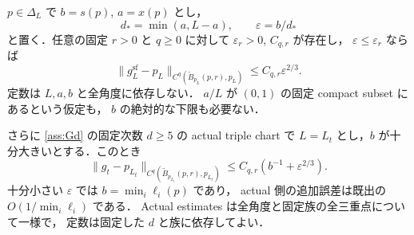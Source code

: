 \begin{proposition}
\label{simplex:prop:facet-product}
$p\in\Delta_L$ で $b=s(p)$, $a=x(p)$ とし，
\[
 d_*=\min(a,L-a),\qquad \varepsilon=b/d_*
\]
と置く．任意の固定 $r>0$ と $q\ge0$ に対して
$\varepsilon_r>0$, $C_{q,r}$ が存在し，
$\varepsilon\le\varepsilon_r$ ならば
\begin{equation}\label{simplex:eq:facet-model-tensor}
 \|g_L^{\mathrm{sf}}-p_L\|
 _{C^q(\widetilde B_{p_L}(p,r),p_L)}
 \le C_{q,r}\varepsilon^{2/3}.
\end{equation}
定数は $L,a,b$ と全角度に依存しない．
$a/L$ が $(0,1)$ の固定 compact subset にあるという仮定も，
$b$ の絶対的な下限も必要ない．

さらに \cref{ass:Gd} の固定次数 $d\ge5$ の actual triple chart で
$L=L_t$ とし，$b$ が十分大きいとする．このとき
\begin{equation}\label{simplex:eq:facet-actual-tensor}
 \|g_t-p_{L_t}\|_{C^q(\widetilde B_{p_{L_t}}(p,r),p_{L_t})}
 \le C_{q,r}\left(b^{-1}+\varepsilon^{2/3}\right).
\end{equation}
十分小さい $\varepsilon$ では $b=\min_i\ell_i(p)$ であり，
actual 側の追加誤差は既出の $O(1/\min_i\ell_i)$ である．
Actual estimates は全角度と固定族の全三重点について一様で，
定数は固定した $d$ と族に依存してよい．
\end{proposition}

